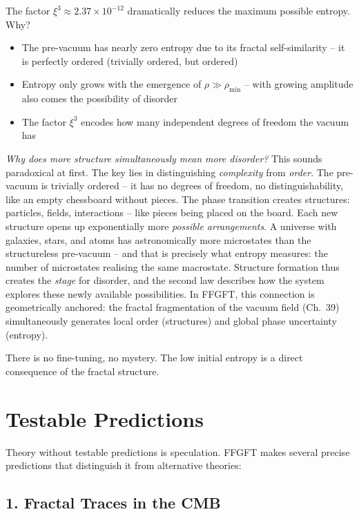 	The factor $\xi^3 \approx 2.37 \times 10^{-12}$ dramatically reduces the maximum possible entropy. Why?
	
	\begin{itemize}[leftmargin=*]
		\item The pre-vacuum has nearly zero entropy due to its fractal self-similarity -- it is perfectly ordered (trivially ordered, but ordered)
		\item Entropy only grows with the emergence of $\rho \gg \rho_{\min}$ -- with growing amplitude also comes the possibility of disorder
		\item The factor $\xi^3$ encodes how many independent degrees of freedom the vacuum has
	\end{itemize}
	
	\textit{Why does more structure simultaneously mean more disorder?} This sounds paradoxical at first. The key lies in distinguishing \textit{complexity} from \textit{order}. The pre-vacuum is trivially ordered -- it has no degrees of freedom, no distinguishability, like an empty chessboard without pieces. The phase transition creates structures: particles, fields, interactions -- like pieces being placed on the board. Each new structure opens up exponentially more \textit{possible arrangements}. A universe with galaxies, stars, and atoms has astronomically more microstates than the structureless pre-vacuum -- and that is precisely what entropy measures: the number of microstates realising the same macrostate. Structure formation thus creates the \textit{stage} for disorder, and the second law describes how the system explores these newly available possibilities. In FFGFT, this connection is geometrically anchored: the fractal fragmentation of the vacuum field (Ch.~39) simultaneously generates local order (structures) and global phase uncertainty (entropy).

	There is no fine-tuning, no mystery. The low initial entropy is a direct consequence of the fractal structure.
	
	\section{Testable Predictions}
	
	Theory without testable predictions is speculation. FFGFT makes several precise predictions that distinguish it from alternative theories:
	
	\subsection{1. Fractal Traces in the CMB}
	
